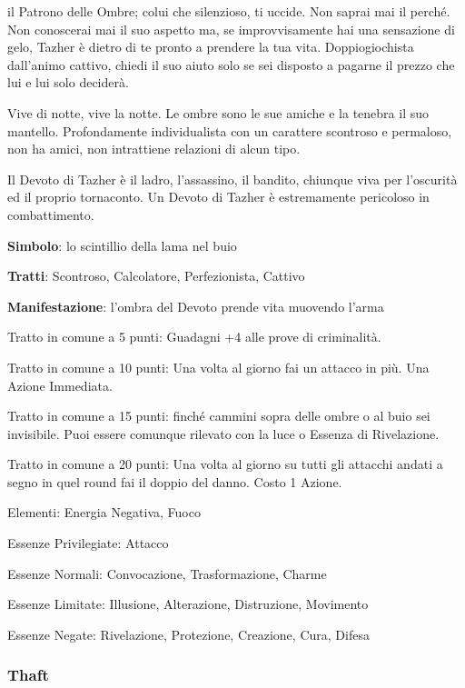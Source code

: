 \documentclass[a4paper,11pt,twoside,openany]{book}
\begin{document}
{\label{tazher}

il Patrono delle Ombre; colui che silenzioso, ti uccide. Non saprai mai il perché. Non conoscerai mai il suo aspetto ma, se improvvisamente hai una sensazione di gelo, Tazher è dietro di te pronto a prendere la tua vita.
Doppiogiochista dall'animo cattivo, chiedi il suo aiuto solo se sei disposto a pagarne il prezzo che lui e lui solo deciderà.

Vive di notte, vive la notte. Le ombre sono le sue amiche e la tenebra il suo mantello. Profondamente individualista con un carattere scontroso e permaloso, non ha amici, non intrattiene relazioni di alcun tipo.

Il Devoto di Tazher è il ladro, l'assassino, il bandito, chiunque viva per l'oscurità ed il proprio tornaconto. Un Devoto di Tazher è estremamente pericoloso in combattimento.

\textbf{Simbolo}: lo scintillio della lama nel buio

\textbf{Tratti}: Scontroso, Calcolatore, Perfezionista, Cattivo

\textbf{Manifestazione}: l'ombra del Devoto prende vita muovendo l'arma

\bigskip

Tratto in comune a 5 punti: Guadagni +4 alle prove di criminalità.

Tratto in comune a 10 punti: Una volta al giorno fai un attacco in più. Una Azione Immediata.

Tratto in comune a 15 punti: finché cammini sopra delle ombre o al buio sei invisibile. Puoi essere comunque rilevato con la luce o Essenza di Rivelazione.

Tratto in comune a 20 punti: Una volta al giorno su tutti gli attacchi andati a segno in quel round fai il doppio del danno. Costo 1 Azione.

\bigskip

Elementi: Energia Negativa, Fuoco

\bigskip

Essenze Privilegiate: Attacco

Essenze Normali: Convocazione, Trasformazione, Charme

Essenze Limitate: Illusione, Alterazione, Distruzione, Movimento

Essenze Negate: Rivelazione, Protezione, Creazione, Cura, Difesa

\subsubsection{Thaft}

}
\end{document}
